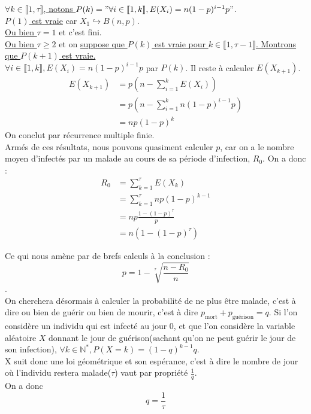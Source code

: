 \documentclass{article}
\begin{document}
	\underline{$\forall k \in \llbracket 1, \tau \rrbracket$, notons $P(k) = "\forall i \in \llbracket 1, k \rrbracket, E(X_i) = n(1-p)^{i-1}p"$}.\\[0.2cm]
	\underline{$P(1)$ est vraie} car $X_1 \hookrightarrow B(n, p)$.\\[0.2cm]
	\underline{Ou bien $\tau = 1$} et c'est fini.\\[0.2cm]
	\underline{Ou bien $\tau \ge 2$} et on \underline{suppose que $P(k)$ est vraie pour $k \in \llbracket 1, \tau - 1 \rrbracket$. Montrons que $P(k+1)$ est vraie.}\\[0.2cm]
	$\forall i \in \llbracket 1, k \rrbracket, E(X_i) = n(1-p)^{i-1}p$ par $P(k)$. Il reste à calculer $E(X_{k+1})$.\\
	\begin{align*}
		E(X_{k+1}) &= p(n - \sum_{i = 1}^k E(X_i)) \\
		           &= p(n - \sum_{i = 1}^k n(1-p)^{i - 1}p) \\
		           &= np(1-p)^k
	\end{align*}
	On conclut par récurrence multiple finie.\\
	Armés de ces résultats, nous pouvons quasiment calculer $p$, car on a le nombre moyen d'infectés par un malade au cours de sa période d'infection, $R_0$. On a donc : \\ 
	\begin{align*}
		R_0 &= \sum_{k=1}^\tau E(X_k) \\
		    &= \sum_{k=1}^\tau np(1-p)^{k-1}\\
		    &= np\frac{1 - (1-p)^\tau}{p}\\
		    &= n(1 - (1-p)^\tau)
	\end{align*}
	
	Ce qui nous amène par de brefs calculs à la conclusion : \\
	$$p = 1 - \sqrt[\tau]{\frac{n - R_0}{n}}$$.\\
	
	On cherchera désormais à calculer la probabilité de ne plus être malade, c'est à dire ou bien de guérir ou bien de mourir, c'est à dire $p_{\text{mort}} + p_{\text{guérison}} = q$. Si l'on considère un individu qui est infecté au jour $0$, et que l'on considère la variable aléatoire $X$ donnant le jour de guérison(sachant qu'on ne peut guérir le jour de son infection), $\forall k \in \mathbb{N}^*, P(X=k) = (1-q)^{k-1}q$.\\
	X suit donc une loi géométrique et son espérance, c'est à dire le nombre de jour où l'individu restera malade($\tau$) vaut par propriété $\frac{1}{q}$.\\
	On a donc $$ q = \frac{1}{\tau}$$\\
	
\end{document}
